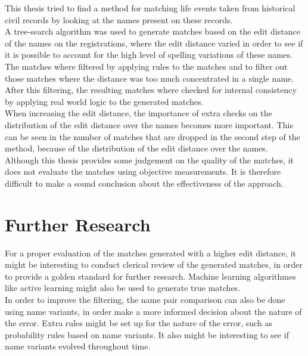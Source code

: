 This thesis tried to find a method for matching life events taken from historical civil records by looking at the names present on these records. \\

A tree-search algorithm was used to generate matches based on the edit distance of the names on the registrations, where the edit distance varied in order to see if it is possible to account for the high level of spelling variations of these names. The matches where filtered by applying rules to the matches and to filter out those matches where the distance was too much concentrated in a single name. \\
After this filtering, the resulting matches where checked for internal consistency by applying real world logic to the generated matches. \\

When increasing the edit distance, the importance of extra checks on the distribution of the edit distance over the names becomes more important. This can be seen in the number of matches that are dropped in the second step of the method, because of the distribution of the edit distance over the names. \\

Although this thesis provides some judgement on the quality of the matches, it does not evaluate the matches using objective measurements. It is therefore difficult to make a sound conclusion about the effectiveness of the approach. 

\section{Further Research}
For a proper evaluation of the matches generated with a higher edit distance, it might be interesting to conduct clerical review of the generated matches, in order to provide a golden standard for further research. Machine learning algorithmes like active learning might also be used to generate true matches.\\

In order to improve the filtering, the name pair comparison can also be done using name variants, in order make a more informed decision about the nature of the error. Extra rules might be set up for the nature of the error, such as probability rules based on name variants. It also might be interesting to see if name variants evolved throughout time.\\

